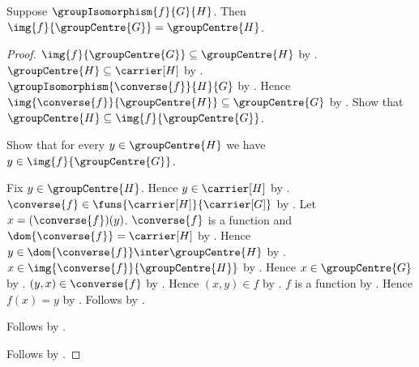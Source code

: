 \begin{theorem}\label{group_isomorphism_centre_image}
    Suppose $\groupIsomorphism{f}{G}{H}$.
    Then $\img{f}{\groupCentre{G}}=\groupCentre{H}$.
\end{theorem}
\begin{proof}
    $\img{f}{\groupCentre{G}}\subseteq\groupCentre{H}$ by
        .
    $\groupCentre{H}\subseteq\carrier[H]$ by
        .
    $\groupIsomorphism{\converse{f}}{H}{G}$ by
        .
    Hence
        $\img{\converse{f}}{\groupCentre{H}}
            \subseteq\groupCentre{G}$ by
        .
    Show that $\groupCentre{H}\subseteq\img{f}{\groupCentre{G}}$.
    \begin{subproof}
        Show that for every $y\in\groupCentre{H}$ we have
            $y\in\img{f}{\groupCentre{G}}$.
        \begin{subproof}
            Fix $y\in\groupCentre{H}$.
            Hence $y\in\carrier[H]$ by .
            $\converse{f}\in\funs{\carrier[H]}{\carrier[G]}$ by
                .
            Let $x=(\converse{f})(y)$.
            $\converse{f}$ is a function and
                $\dom{\converse{f}}=\carrier[H]$ by
                .
            Hence $y\in\dom{\converse{f}}\inter\groupCentre{H}$ by
                .
            $x\in\img{\converse{f}}{\groupCentre{H}}$ by
                .
            Hence $x\in\groupCentre{G}$ by .
            $(y,x)\in\converse{f}$ by
                .
            Hence $(x,y)\in f$ by .
            $f$ is a function by
                .
            Hence $f(x)=y$ by
                .
            Follows by
                .
        \end{subproof}
        Follows by .
    \end{subproof}
    Follows by .
\end{proof}
